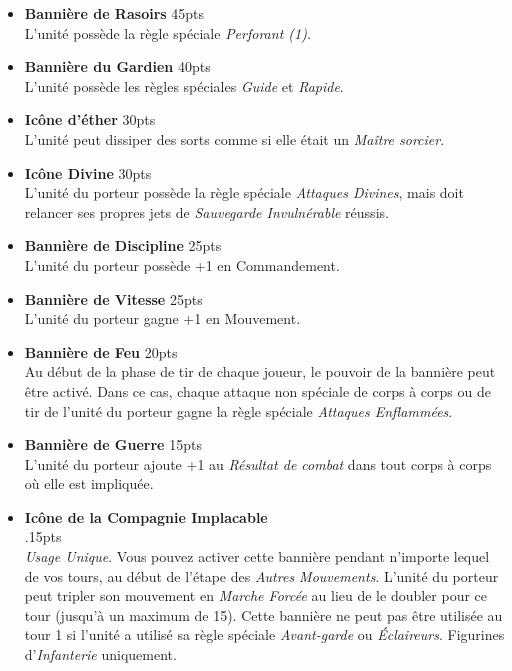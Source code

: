\begin{multicols}{2}
\begin{itemize}[label={-}]
\item \textbf{Bannière de Rasoirs} \dotfill \unit{45}{pts} \\
L'unité  possède la règle spéciale \emph{Perforant (1)}.

\item \textbf{Bannière du Gardien} \dotfill \unit{40}{pts} \\
L'unité  possède les règles spéciales \emph{Guide} et \emph{Rapide}.

\item \textbf{Icône d'éther} \dotfill \unit{30}{pts} \\
L'unité  peut dissiper des sorts comme si elle était un \emph{Maître sorcier}.

\item \textbf{Icône Divine} \dotfill \unit{30}{pts} \\
L'unité du porteur possède la règle spéciale \emph{Attaques Divines}, mais doit relancer ses propres jets de \emph{Sauvegarde Invulnérable} réussis.

\item \textbf{Bannière de Discipline} \dotfill \unit{25}{pts} \\
L'unité du porteur possède +1 en Commandement.

\item \textbf{Bannière de Vitesse} \dotfill \unit{25}{pts} \\
L'unité du porteur gagne +1 en Mouvement.

\item \textbf{Bannière de Feu} \dotfill \unit{20}{pts} \\
Au début de la phase de tir de chaque joueur, le pouvoir de la bannière peut être activé. Dans ce cas, chaque attaque non spéciale de corps à corps ou de tir de l'unité du porteur gagne la règle spéciale \emph{Attaques Enflammées}.

\item \textbf{Bannière de Guerre} \dotfill \unit{15}{pts} \\
L'unité du porteur ajoute +1 au \emph{Résultat de combat} dans tout corps à corps où elle est impliquée.

\medskip
\item \textbf{Icône de la Compagnie Implacable} \\ .\dotfill \unit{15}{pts} \\
\emph{Usage Unique}. Vous pouvez activer cette bannière pendant n'importe lequel de vos tours, au début de l'étape des \emph{Autres Mouvements}. L'unité du porteur peut tripler son mouvement en \emph{Marche Forcée} au lieu de le doubler pour ce tour (jusqu'à un maximum de \unit{15}{\pouce}). Cette bannière ne peut pas être utilisée au tour 1 si l'unité a utilisé sa règle spéciale \emph{Avant-garde} ou \emph{Éclaireurs}. Figurines d'\emph{Infanterie} uniquement.


\end{itemize}
\end{multicols}
